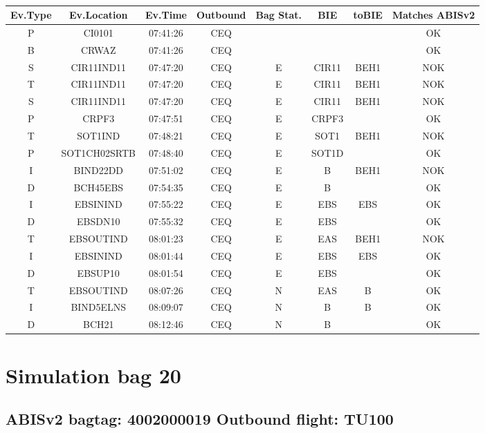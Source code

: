 \documentclass{report}
\begin{document}
\paragraph{}
\begin{longtable}{cccccccc}    \toprule
\rowcolor{white!50}
\textbf{Ev.Type} & \textbf{Ev.Location} & \textbf{Ev.Time} & \textbf{Outbound} & \textbf{Bag Stat.} & \textbf{BIE} & \textbf{toBIE} & \textbf{Matches ABISv2} \\\midrule
P & CI0101 & 07:41:26  & CEQ &  &  &  & OK\\
B & CRWAZ & 07:41:26  & CEQ &  &  &  & OK\\
S & CIR11IND11 & 07:47:20  & CEQ & E & CIR11 & BEH1 & NOK\\
T & CIR11IND11 & 07:47:20  & CEQ & E & CIR11 & BEH1 & NOK\\
S & CIR11IND11 & 07:47:20  & CEQ & E & CIR11 & BEH1 & NOK\\
P & CRPF3 & 07:47:51  & CEQ & E & CRPF3 &  & OK\\
T & SOT1IND & 07:48:21  & CEQ & E & SOT1 & BEH1 & NOK\\
P & SOT1CH02SRTB & 07:48:40  & CEQ & E & SOT1D &  & OK\\
I & BIND22DD & 07:51:02  & CEQ & E & B & BEH1 & NOK\\
D & BCH45EBS & 07:54:35  & CEQ & E & B &  & OK\\
I & EBSININD & 07:55:22  & CEQ & E & EBS & EBS & OK\\
D & EBSDN10 & 07:55:32  & CEQ & E & EBS &  & OK\\
T & EBSOUTIND & 08:01:23  & CEQ & E & EAS & BEH1 & NOK\\
I & EBSININD & 08:01:44  & CEQ & E & EBS & EBS & OK\\
D & EBSUP10 & 08:01:54  & CEQ & E & EBS &  & OK\\
T & EBSOUTIND & 08:07:26  & CEQ & N & EAS & B & OK\\
I & BIND5ELNS & 08:09:07  & CEQ & N & B & B & OK\\
D & BCH21 & 08:12:46  & CEQ & N & B &  & OK\\
\bottomrule
\end{longtable}
\pagebreak
\section*{Simulation bag 20}
\subsection*{ABISv2 bagtag: 4002000019 Outbound flight: TU100}
\end{document}
